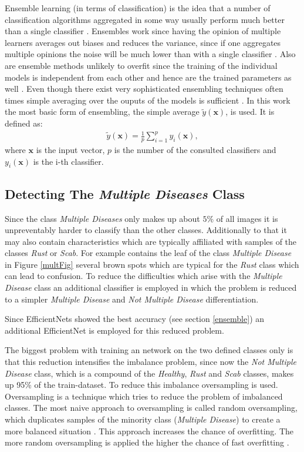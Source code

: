 \documentclass[10pt,twocolumn,letterpaper]{article}
\begin{document}
Ensemble learning (in terms of classification) is the idea that a number of classification algorithms aggregated in some way usually perform much better than a single classifier \cite{polikar2012ensemble}. Ensembles work since having the opinion of multiple learners averages out biases and reduces the variance, since if one aggregates multiple opinions the noise will be much lower than with a single classifier \cite{dietterich2002ensemble, zhou2009ensemble}. Also are ensemble methods unlikely to overfit since the training of the individual models is independent from each other and hence are the trained parameters as well \cite{zhou2009ensemble}. Even though there exist very sophisticated ensembling techniques often times simple averaging over the ouputs of the models is sufficient \cite{krawczyk2017ensemble, mendes2012ensemble}. In this work the most basic form of ensembling, the simple average $\tilde{y}(\mathbf{x})$, is used. It is defined as:
\begin{align}
\tilde{y}(\mathbf{x}) = \frac{1}{p}\sum_{i=1}^{p}y_i(\mathbf{x}),
\end{align}
where $\mathbf{x}$ is the input vector, $p$ is the number of the consulted classifiers and $y_i(\mathbf{x})$ is the i-th classifier.
\subsection{Detecting The \textbf{\textit{Multiple Diseases}} Class} \label{outlier_detection}
Since the class \textit{Multiple Diseases} only makes up about $5\%$ of all images it is unpreventably harder to classify than the other classes. Additionally to that it may also contain characteristics which are typically affiliated with samples of the classes \textit{Rust} or \textit{Scab}. For example contains the leaf of the class \textit{Multiple Disease} in Figure \ref{multFig} several brown spots which are typical for the \textit{Rust} class which can lead to confusion. To reduce the difficulties which arise with the \textit{Multiple Disease} class an additional classifier is employed in which the problem is reduced to a simpler \textit{Multiple Disease} and \textit{Not Multiple Disease} differentiation. 

Since EfficientNets showed the best accuracy (see section \ref{ensemble}) an additional EfficientNet is employed for this reduced problem.

The biggest problem with training an network on the two defined classes only is that this reduction intensifies the imbalance problem, since now the \textit{Not Multiple Disease} class, which is a  compound of the \textit{Healthy}, \textit{Rust} and \textit{Scab} classes, makes up 95\% of the train-dataset. To reduce this imbalance oversampling is used. Oversampling is a technique which tries to reduce the problem of imbalanced classes. The most naive approach to oversampling is called random oversampling, which duplicates samples of the minority class (\textit{Multiple Disease}) to create a more balanced situation \cite{he2013imbalanced}. This approach increases the chance of overfitting. The more random oversampling is applied the higher the chance of fast overfitting \cite{chawla2002smote}. 
\end{document}
